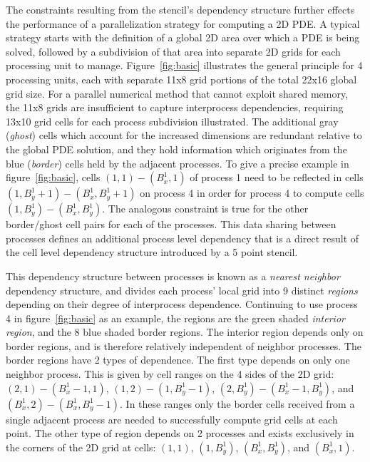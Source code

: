 The constraints resulting from the stencil's dependency structure
further effects the performance of a
parallelization strategy for computing a 2D PDE.  A typical
strategy starts with the definition of a global 2D area over which
a PDE is being solved, followed by a subdivision of that area
into separate 2D grids for each
processing unit to manage.  Figure~\ref{fig:basic} illustrates the general principle for
4 processing units, each with separate
11x8 grid portions of the total 22x16 global grid size.
For a parallel numerical method that cannot exploit shared memory,
the 11x8 grids are insufficient to capture interprocess
dependencies, requiring
13x10 grid cells for each process subdivision illustrated.
The additional gray ({\it ghost}) cells which account for the increased
dimensions are redundant relative to the global PDE solution, and they
hold information which originates from the blue ({\it border}) cells
held by the adjacent processes.  To give a precise example in
figure~\ref{fig:basic},
cells $(1,1) - (B_x^1,1)$ of process 1 need to be
reflected in cells $(1,B_y^1+1) - (B_x^1, B_y^1+1)$ on process 4 in order
for process 4 to compute cells $(1,B_y^1) - (B_x^1, B_y^1)$.  The analogous
constraint is true for the other border/ghost cell pairs for each of the
processes.
This data sharing between processes defines an additional process level
 dependency that is a direct
  result of the cell level dependency structure introduced by a 5 point
  stencil.

This dependency structure between processes is known as a
{\it nearest neighbor} dependency structure, and divides
each process' local grid into 9 distinct {\it regions} depending on
their degree of interprocess dependence.  Continuing to use process 4
in figure~\ref{fig:basic} as an example, the
regions are the green
shaded {\it interior region}, and the 8 blue shaded border regions.  The interior region depends only on border
regions, and is therefore relatively independent of neighbor processes.
The border regions have 2 types of dependence.  The first type depends on only one neighbor process.  This is
given by cell ranges on the 4 sides of the 2D grid: $(2,1) - (B_x^1 - 1, 1)$, $(1,2) - (1,B_y^1 - 1)$,
$(2,B_y^1) - (B_x^1 - 1, B_y^1)$, and $(B_x^1,2) - (B_x^1,B_y^1 - 1)$.  In these ranges only the
border cells received from a single adjacent process are
needed to successfully compute grid cells at each point.  The other type of
region depends on 2 processes and exists exclusively
in the corners of the 2D grid at cells: $(1,1)$, $(1,B_y^1)$, $(B_x^1,B_y^1)$,
and $(B_x^1,1)$.


